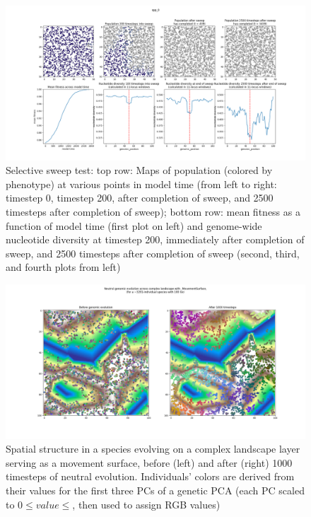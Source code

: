 ﻿\documentclass{article}
\begin{document}
\begin{figure}[h!]
\includegraphics[width=175mm]{./img/validation/sweep/sweep_results.png}
        \caption{Selective sweep test: top row: Maps of population (colored by phenotype) at various points in model time (from left to right: timestep 0, timestep 200, after completion of sweep, and 2500 timesteps after completion of sweep); bottom row: mean fitness as a function of model time (first plot on left) and genome-wide nucleotide diversity at timestep 200, immediately after completion of sweep, and 2500 timesteps after completion of sweep (second, third, and fourth plots from left)}
\end{figure}


\begin{figure}[h!]
        \includegraphics[width=175mm]{./img/validation/PCA/PCA_plot.png}
        \caption{Spatial structure in a species evolving on a complex landscape layer serving as a movement surface, before (left) and after (right) 1000 timesteps of neutral evolution. Individuals' colors are derived from their values for the first three PCs of a genetic PCA (each PC scaled to $0\leq value\leq$, then used to assign RGB values)}
\end{figure}
\end{document}
